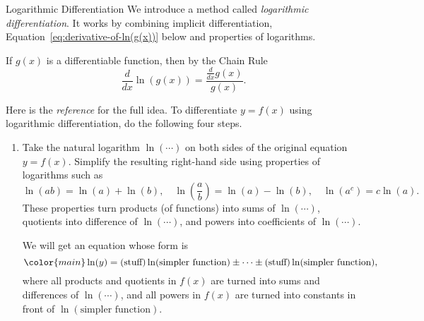 \documentclass[../main.tex]{subfiles}
\begin{document}
\begin{lesson}{Logarithmic Differentiation}
  We introduce a method called \emph{logarithmic differentiation}. It works by combining implicit differentiation, Equation~\eqref{eq:derivative-of-ln(g(x))} below and properties of logarithms.
  \begin{mdframed}[style=withref]
    If \(g(x)\) is a differentiable function, then by the Chain Rule
    \begin{equation} \label{eq:derivative-of-ln(g(x))}
      \frac{d}{dx} \ln( g(x) ) = \frac{\frac{d}{dx}g(x)}{g(x)}.
    \end{equation}

  \end{mdframed}

  Here is the \emph{reference} for the full idea. To differentiate \(y = f(x)\) using logarithmic differentiation, do the following four steps.
  \begin{enumerate}
    \item Take the natural logarithm \(\ln(\cdots{})\) on both sides of the original equation \(y = f(x)\). Simplify the resulting right-hand side using properties of logarithms such as 
      \[
        \ln(ab) = \ln(a) + \ln(b), \quad \ln\left(\frac{a}{b}\right) = \ln(a) - \ln(b), \quad \ln(a^{c}) = c \ln(a). 
      \]
      These properties turn products (of functions) into sums of \(\ln(\cdots)\), quotients into difference of \(\ln(\cdots)\), and powers into coefficients of \(\ln(\cdots)\).

      We will get an equation whose form is 
      \begin{equation} \label{eq:logarithmic-differentiation}
        \color{main}
        \ln(y) = (\text{stuff})\ln( \text{simpler function} ) \pm \cdots \pm (\text{stuff})\ln( \text{simpler function} ),
      \end{equation}
      where all products and quotients in \(f(x)\) are turned into sums and differences of \(\ln(\cdots)\), and all powers in \(f(x)\) are turned into constants in front of \(\ln(\text{simpler function})\).



\end{enumerate}
\end{lesson}
\end{document}
